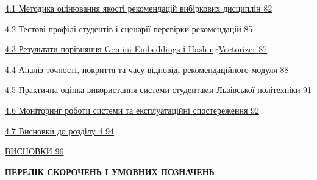 \documentclass[
]{article}
\begin{document}
\hyperref[Xf97a46f423aba4c2be3ead83d121b35af23a104]{4.1 Методика
оцінювання якості рекомендацій вибіркових дисциплін
\hyperref[Xf97a46f423aba4c2be3ead83d121b35af23a104]{82}}

\hyperref[ux442ux435ux441ux442ux43eux432ux456-ux434ux430ux43dux456-ux442ux430-ux441ux446ux435ux43dux430ux440ux456ux457-ux432ux438ux43fux440ux43eux431ux443ux432ux430ux43dux44c]{4.2
Тестові профілі студентів і сценарії перевірки рекомендацій
\hyperref[ux442ux435ux441ux442ux43eux432ux456-ux434ux430ux43dux456-ux442ux430-ux441ux446ux435ux43dux430ux440ux456ux457-ux432ux438ux43fux440ux43eux431ux443ux432ux430ux43dux44c]{85}}

\hyperref[ux440ux435ux437ux443ux43bux44cux442ux430ux442ux438-ux435ux43aux441ux43fux435ux440ux438ux43cux435ux43dux442ux443]{4.3
Результати порівняння Gemini Embeddings і HashingVectorizer
\hyperref[ux440ux435ux437ux443ux43bux44cux442ux430ux442ux438-ux435ux43aux441ux43fux435ux440ux438ux43cux435ux43dux442ux443]{87}}

\hyperref[ux430ux43dux430ux43bux456ux437-ux440ux435ux437ux443ux43bux44cux442ux430ux442ux456ux432]{4.4
Аналіз точності, покриття та часу відповіді рекомендаційного модуля
\hyperref[ux430ux43dux430ux43bux456ux437-ux440ux435ux437ux443ux43bux44cux442ux430ux442ux456ux432]{88}}

\hyperref[ux43eux431ux433ux43eux432ux43eux440ux435ux43dux43dux44f-ux442ux430-ux43fux440ux430ux43aux442ux438ux447ux43dux430-ux43eux446ux456ux43dux43aux430-ux441ux438ux441ux442ux435ux43cux438]{4.5
Практична оцінка використання системи студентами Львівської політехніки
\hyperref[ux43eux431ux433ux43eux432ux43eux440ux435ux43dux43dux44f-ux442ux430-ux43fux440ux430ux43aux442ux438ux447ux43dux430-ux43eux446ux456ux43dux43aux430-ux441ux438ux441ux442ux435ux43cux438]{91}}

\hyperref[Xddcc2d41e218d4eab0104affeeaeb116ef3d72e]{4.6 Моніторинг
роботи системи та експлуатаційні спостереження
\hyperref[Xddcc2d41e218d4eab0104affeeaeb116ef3d72e]{92}}

\hyperref[ux432ux438ux441ux43dux43eux432ux43aux438-ux434ux43e-ux440ux43eux437ux434ux456ux43bux443-4]{4.7
Висновки до розділу 4
\hyperref[ux432ux438ux441ux43dux43eux432ux43aux438-ux434ux43e-ux440ux43eux437ux434ux456ux43bux443-4]{94}}

\hyperref[_Toc230434113]{ВИСНОВКИ \hyperref[_Toc230434113]{96}}

\textbf{\hfill\break
}

\textbf{ПЕРЕЛІК СКОРОЧЕНЬ І УМОВНИХ ПОЗНАЧЕНЬ}
\end{document}

